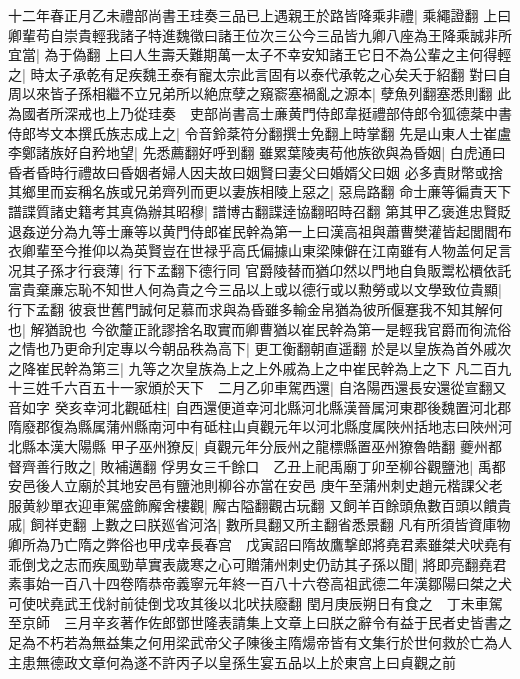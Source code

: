 十二年春正月乙未禮部尚書王珪奏三品已上遇親王於路皆降乘非禮|{
	乘繩證翻}
上曰卿輩苟自崇貴輕我諸子特進魏徵曰諸王位次三公今三品皆九卿八座為王降乘誠非所宜當|{
	為于偽翻}
上曰人生壽夭難期萬一太子不幸安知諸王它日不為公輩之主何得輕之|{
	時太子承乾有足疾魏王泰有寵太宗此言固有以泰代承乾之心矣夭于紹翻}
對曰自周以來皆子孫相繼不立兄弟所以絶庶孽之窺窬塞禍亂之源本|{
	孽魚列翻塞悉則翻}
此為國者所深戒也上乃從珪奏　吏部尚書高士亷黄門侍郎韋挺禮部侍郎令狐德棻中書侍郎岑文本撰氏族志成上之|{
	令音鈴棻符分翻撰士免翻上時掌翻}
先是山東人士崔盧李鄭諸族好自矜地望|{
	先悉薦翻好呼到翻}
雖累葉陵夷苟他族欲與為昏姻|{
	白虎通曰昏者昏時行禮故曰昏姻者婦人因夫故曰姻賢曰妻父曰婚婿父曰姻}
必多責財幣或捨其鄉里而妄稱名族或兄弟齊列而更以妻族相陵上惡之|{
	惡烏路翻}
命士亷等徧責天下譜諜質諸史籍考其真偽辦其昭穆|{
	譜博古翻諜逹協翻昭時召翻}
第其甲乙褒進忠賢貶退姦逆分為九等士亷等以黄門侍郎崔民幹為第一上曰漢高祖與蕭曹樊灌皆起閭閻布衣卿輩至今推仰以為英賢豈在世禄乎高氏偏據山東梁陳僻在江南雖有人物盖何足言况其子孫才行衰薄|{
	行下孟翻下德行同}
官爵陵替而猶卬然以門地自負販鬻松檟依託富貴棄亷忘恥不知世人何為貴之今三品以上或以德行或以勲勞或以文學致位貴顯|{
	行下孟翻}
彼衰世舊門誠何足慕而求與為昏雖多輸金帛猶為彼所偃蹇我不知其解何也|{
	解猶說也}
今欲釐正訛謬捨名取實而卿曹猶以崔民幹為第一是輕我官爵而徇流俗之情也乃更命刋定專以今朝品秩為高下|{
	更工衡翻朝直遥翻}
於是以皇族為首外戚次之降崔民幹為第三|{
	九等之次皇族為上之上外戚為上之中崔民幹為上之下}
凡二百九十三姓千六百五十一家頒於天下　二月乙卯車駕西還|{
	自洛陽西還長安還從宣翻又音如字}
癸亥幸河北觀砥柱|{
	自西還便道幸河北縣河北縣漢晉属河東郡後魏置河北郡隋廢郡復為縣属蒲州縣南河中有砥柱山貞觀元年以河北縣度属陜州括地志曰陜州河北縣本漢大陽縣}
甲子巫州獠反|{
	貞觀元年分辰州之龍標縣置巫州獠魯皓翻}
夔州都督齊善行敗之|{
	敗補邁翻}
俘男女三千餘口　乙丑上祀禹廟丁卯至柳谷觀鹽池|{
	禹都安邑後人立廟於其地安邑有鹽池則柳谷亦當在安邑}
庚午至蒲州刺史趙元楷課父老服黄紗單衣迎車駕盛飾廨舍樓觀|{
	廨古隘翻觀古玩翻}
又飼羊百餘頭魚數百頭以饋貴戚|{
	飼祥吏翻}
上數之曰朕廵省河洛|{
	數所具翻又所主翻省悉景翻}
凡有所須皆資庫物卿所為乃亡隋之弊俗也甲戌幸長春宫　戊寅詔曰隋故鷹撃郎將堯君素雖桀犬吠堯有乖倒戈之志而疾風勁草實表歲寒之心可贈蒲州刺史仍訪其子孫以聞|{
	將即亮翻堯君素事始一百八十四卷隋恭帝義寧元年終一百八十六卷高祖武德二年漢鄒陽曰桀之犬可使吠堯武王伐紂前徒倒戈攻其後以北吠扶廢翻}
閏月庚辰朔日有食之　丁未車駕至京師　三月辛亥著作佐郎鄧世隆表請集上文章上曰朕之辭令有益于民者史皆書之足為不朽若為無益集之何用梁武帝父子陳後主隋煬帝皆有文集行於世何救於亡為人主患無德政文章何為遂不許丙子以皇孫生宴五品以上於東宫上曰貞觀之前

